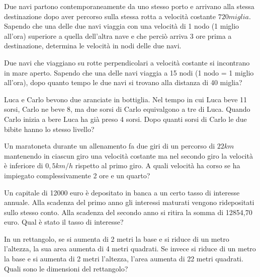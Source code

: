 \begin{multicols}{2}
\begin{esercizio}[\Ast]
 \label{ese:3.128}
Due navi partono contemporaneamente da uno stesso porto e arrivano alla
stessa destinazione dopo aver percorso sulla stessa rotta a velocità
costante $ 720\unit{miglia} $. Sapendo che una delle due navi viaggia con una velocità
di 1 nodo (1 miglio all'ora) superiore a quella dell'altra nave e che perciò
arriva 3 ore prima a destinazione, determina le velocità in nodi delle due
navi.
\end{esercizio}

\begin{esercizio}
 \label{ese:3.129}
Due navi che viaggiano su rotte perpendicolari a velocità costante si
incontrano in mare aperto. Sapendo che una delle navi viaggia a 15 nodi (1
nodo = 1 miglio all'ora), dopo quanto tempo le due navi si trovano alla
distanza di 40 miglia?
\end{esercizio}

\begin{esercizio}
 \label{ese:3.130}
Luca e Carlo bevono due aranciate in bottiglia. Nel tempo in cui Luca beve
11 sorsi, Carlo ne beve 8, ma due sorsi di Carlo equivalgono a tre di Luca.
Quando Carlo inizia a bere Luca ha già preso 4 sorsi. Dopo quanti sorsi di
Carlo le due bibite hanno lo stesso livello?
\end{esercizio}

\begin{esercizio}
 \label{ese:3.131}
Un maratoneta durante un allenamento fa due giri di un percorso di $ 22\unit{km} $
mantenendo in ciascun giro una velocità costante ma nel secondo giro la
velocità è inferiore di $ 0,5\unit{km/h} $ rispetto al primo giro. A quali velocità
ha corso se ha impiegato complessivamente 2 ore e un quarto?
\end{esercizio}

\begin{esercizio}[\Ast]
 \label{ese:3.132}
Un capitale di 12000 euro è depositato in banca a un certo tasso di interesse
annuale. Alla scadenza del primo anno gli interessi maturati vengono
ridepositati sullo stesso conto. Alla scadenza del secondo anno si ritira la
somma di 12854,70 euro. Qual è stato il tasso di interesse?
\end{esercizio}

\begin{esercizio}
 \label{ese:3.133}
In un rettangolo, se si aumenta di 2 metri la base e si riduce di un metro
l’altezza, la sua area aumenta di 4 metri quadrati. Se invece si riduce di
un metro la base e si aumenta di 2 metri l’altezza, l’area aumenta di 22
metri quadrati. Quali sono le dimensioni del rettangolo?
\end{esercizio}


\end{multicols}

